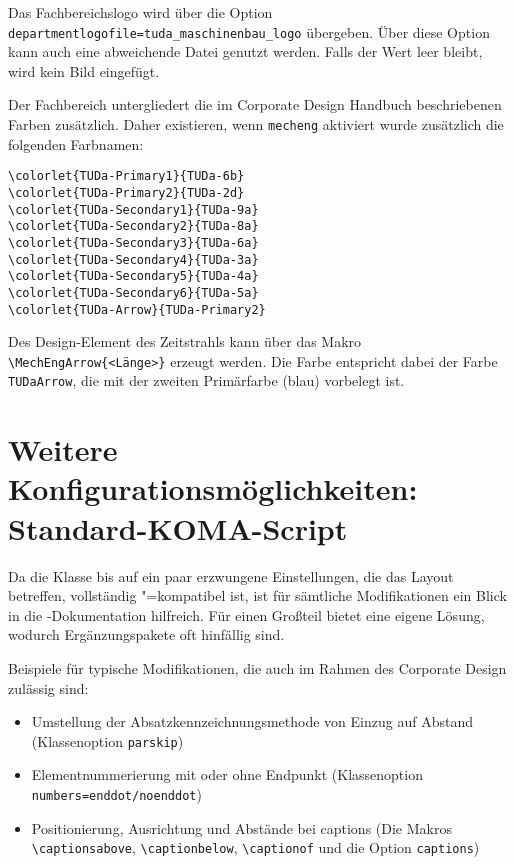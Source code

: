\documentclass[
	german,
	accentcolor=9c,%
	]{tudapub}
\let\code\texttt
\begin{document}
Das Fachbereichslogo wird über die Option \verb+departmentlogofile=tuda_maschinenbau_logo+ übergeben. Über diese Option kann auch eine abweichende Datei genutzt werden. Falls der Wert leer bleibt, wird kein Bild eingefügt.

Der Fachbereich untergliedert die im Corporate Design Handbuch beschriebenen Farben zusätzlich. Daher existieren, wenn \code{mecheng} aktiviert wurde zusätzlich die folgenden Farbnamen:

\begin{verbatim}
\colorlet{TUDa-Primary1}{TUDa-6b}
\colorlet{TUDa-Primary2}{TUDa-2d}
\colorlet{TUDa-Secondary1}{TUDa-9a}
\colorlet{TUDa-Secondary2}{TUDa-8a}
\colorlet{TUDa-Secondary3}{TUDa-6a}
\colorlet{TUDa-Secondary4}{TUDa-3a}
\colorlet{TUDa-Secondary5}{TUDa-4a}
\colorlet{TUDa-Secondary6}{TUDa-5a}
\colorlet{TUDa-Arrow}{TUDa-Primary2}
\end{verbatim}

Des Design-Element des Zeitstrahls kann über das Makro \verb+\MechEngArrow{<Länge>}+ erzeugt werden. Die Farbe entspricht dabei der Farbe \code{TUDaArrow}, die mit der zweiten Primärfarbe (blau) vorbelegt ist.

\section{Weitere Konfigurationsmöglichkeiten: Standard-KOMA-Script}
\label{sec:KOMA}
Da die Klasse bis auf ein paar erzwungene Einstellungen, die das Layout betreffen, vollständig \KOMAScript"=kompatibel ist, ist für sämtliche Modifikationen ein Blick in die \KOMAScript-Dokumentation hilfreich. Für einen Großteil bietet \KOMAScript{} eine eigene Lösung, wodurch Ergänzungspakete oft hinfällig sind.

Beispiele für typische Modifikationen, die auch im Rahmen des Corporate Design zulässig sind:
\begin{itemize}
	\item Umstellung der Absatzkennzeichnungsmethode von Einzug auf Abstand (Klassenoption \verb+parskip+)
	\item Elementnummerierung mit oder ohne Endpunkt (Klassenoption \verb+numbers=enddot/noenddot+)
	\item Positionierung, Ausrichtung und Abstände bei captions (Die Makros \verb+\captionsabove+, \verb+\captionbelow+, \verb+\captionof+ und die Option \verb+captions+)
\end{itemize}
\end{document}
